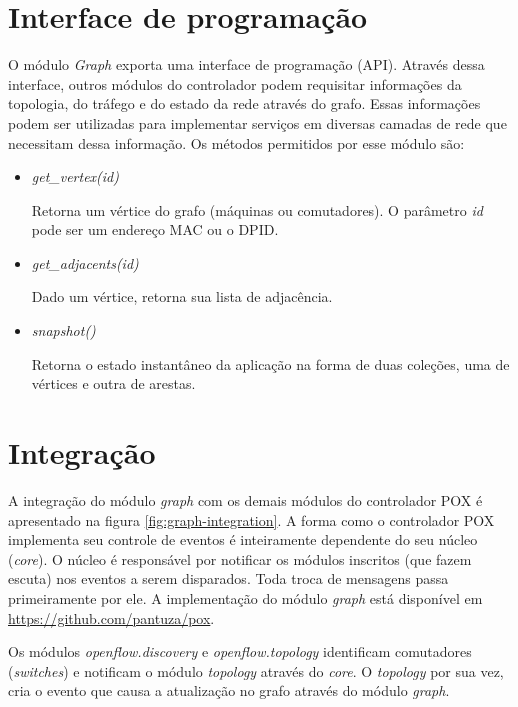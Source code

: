 \section{Interface de programação}

O módulo \emph{Graph} exporta uma interface de programação (API).
Através dessa interface, outros módulos do controlador podem requisitar 
informações da topologia, do tráfego e do estado da rede através do grafo.
Essas informações podem ser utilizadas para implementar serviços em diversas
camadas de rede que necessitam dessa informação.
Os métodos permitidos por esse módulo são:

\begin{itemize}
    \item \emph{get\_vertex(id)}

        Retorna um vértice do grafo (máquinas ou comutadores). 
        O parâmetro \emph{id} pode ser um endereço MAC ou o DPID.

    \item \emph{get\_adjacents(id)}

        Dado um vértice, retorna sua lista de adjacência.

    \item \emph{snapshot()}

        Retorna o estado instantâneo da aplicação na forma de duas coleções,
        uma de vértices e outra de arestas.
\end{itemize}

\section{Integração}

A integração do módulo \emph{graph} com os demais módulos do controlador POX
é apresentado na figura \ref{fig:graph-integration}.
A forma como o controlador POX implementa seu controle de eventos é 
inteiramente dependente do seu núcleo (\emph{core}).
O núcleo é responsável por notificar os módulos inscritos (que fazem escuta) 
nos eventos a serem disparados.
Toda troca de mensagens passa primeiramente por ele.
A implementação do módulo \emph{graph} está disponível em 
\url{https://github.com/pantuza/pox}.

Os módulos \emph{openflow.discovery} e \emph{openflow.topology} identificam 
comutadores (\emph{switches}) e notificam o módulo \emph{topology} através do
\emph{core}. 
O \emph{topology} por sua vez, cria o evento que causa a atualização no grafo
através do módulo \emph{graph}.

